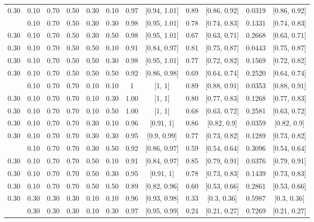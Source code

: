 \documentclass[
  11pt,
]{article}
\begin{document}
\begin{landscape}
\begin{ThreePartTable}
\begin{longtable}[t]{cccccccccccc}
0.30 & 0.10 & 0.70 & 0.50 & 0.30 & 0.10 & 0.97 & {}[0.94, 1.01] & 0.89 & {}[0.86, 0.92] & 0.0319 & {}[0.86, 0.92]\\
\addlinespace
0.30 & 0.10 & 0.70 & 0.50 & 0.30 & 0.30 & 0.98 & {}[0.95, 1.01] & 0.78 & {}[0.74, 0.83] & 0.1331 & {}[0.74, 0.83]\\
0.30 & 0.10 & 0.70 & 0.50 & 0.30 & 0.50 & 0.98 & {}[0.95, 1.01] & 0.67 & {}[0.63, 0.71] & 0.2668 & {}[0.63, 0.71]\\
0.30 & 0.10 & 0.70 & 0.50 & 0.50 & 0.10 & 0.91 & {}[0.84, 0.97] & 0.81 & {}[0.75, 0.87] & 0.0443 & {}[0.75, 0.87]\\
0.30 & 0.10 & 0.70 & 0.50 & 0.50 & 0.30 & 0.98 & {}[0.95, 1.01] & 0.77 & {}[0.72, 0.82] & 0.1569 & {}[0.72, 0.82]\\
0.30 & 0.10 & 0.70 & 0.50 & 0.50 & 0.50 & 0.92 & {}[0.86, 0.98] & 0.69 & {}[0.64, 0.74] & 0.2520 & {}[0.64, 0.74]\\
\addlinespace
0.30 & 0.10 & 0.70 & 0.70 & 0.10 & 0.10 & 1 & {}[1, 1] & 0.89 & {}[0.88, 0.91] & 0.0353 & {}[0.88, 0.91]\\
0.30 & 0.10 & 0.70 & 0.70 & 0.10 & 0.30 & 1.00 & {}[1, 1] & 0.80 & {}[0.77, 0.83] & 0.1268 & {}[0.77, 0.83]\\
0.30 & 0.10 & 0.70 & 0.70 & 0.10 & 0.50 & 1.00 & {}[1, 1] & 0.68 & {}[0.63, 0.72] & 0.2581 & {}[0.63, 0.72]\\
0.30 & 0.10 & 0.70 & 0.70 & 0.30 & 0.10 & 0.96 & {}[0.91, 1] & 0.86 & {}[0.82, 0.9] & 0.0359 & {}[0.82, 0.9]\\
0.30 & 0.10 & 0.70 & 0.70 & 0.30 & 0.30 & 0.95 & {}[0.9, 0.99] & 0.77 & {}[0.73, 0.82] & 0.1289 & {}[0.73, 0.82]\\
\addlinespace
0.30 & 0.10 & 0.70 & 0.70 & 0.30 & 0.50 & 0.92 & {}[0.86, 0.97] & 0.59 & {}[0.54, 0.64] & 0.3096 & {}[0.54, 0.64]\\
0.30 & 0.10 & 0.70 & 0.70 & 0.50 & 0.10 & 0.91 & {}[0.84, 0.97] & 0.85 & {}[0.79, 0.91] & 0.0376 & {}[0.79, 0.91]\\
0.30 & 0.10 & 0.70 & 0.70 & 0.50 & 0.30 & 0.95 & {}[0.91, 1] & 0.78 & {}[0.73, 0.83] & 0.1439 & {}[0.73, 0.83]\\
0.30 & 0.10 & 0.70 & 0.70 & 0.50 & 0.50 & 0.89 & {}[0.82, 0.96] & 0.60 & {}[0.53, 0.66] & 0.2861 & {}[0.53, 0.66]\\
0.30 & 0.30 & 0.30 & 0.30 & 0.10 & 0.10 & 0.96 & {}[0.93, 0.98] & 0.33 & {}[0.3, 0.36] & 0.5987 & {}[0.3, 0.36]\\
\addlinespace
0.30 & 0.30 & 0.30 & 0.30 & 0.10 & 0.30 & 0.97 & {}[0.95, 0.99] & 0.24 & {}[0.21, 0.27] & 0.7269 & {}[0.21, 0.27]\\

\end{longtable}
\end{ThreePartTable}
\end{landscape}
\end{document}
